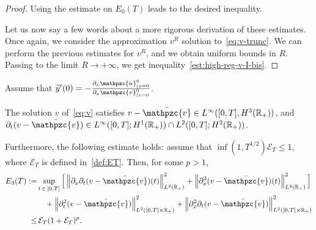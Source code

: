 \documentclass[AHL,Unicode,longabstracts,published]{cedram}
\newcommand{\R}{\mathbb{R}}
\newcommand{\p}{\partial}
\newcommand{\bv}{\bar{\mathpzc{v}}}
\newcommand{\cE}{\mathcal E}
\newcommand{\tv}{\mathpzc{v}}
\newcommand{\tu}{\mathpzc{u}}
\newcommand{\ty}{\widetilde{y}}
\begin{document}
\begin{proof}
Using the estimate on $E_0(T)$ leads to the desired inequality.



Let us now say a few words about a more rigorous derivation of these estimates. Once again, we consider the approximation $v^R$ solution to~\eqref{eq:v-trunc}. We can perform the previous estimates for $v^R$, and we obtain uniform bounds in $R$. Passing to the limit $R\to +\infty$, we get inequality~\eqref{est:high-reg-v-I-bis}.
\end{proof}


\begin{lemm}\label{lem:Hreg-v-2}
Assume that $\ty'(0)= - \frac{\p_x \tu^0_{|x=0}}{\partial_x \tv^0_{|x=0}}$.


The solution $v$ of~\eqref{eq:v} satisfies $v -\bv \in L^\infty([0,T], H^3(\R_+))$, and $\partial_t(v-\bv) \in L^\infty([0,T];H^1(\R_+)) \cap L^2([0,T]; H^2(\R_+))$.

Furthermore, the following estimate holds: assume that $\inf(1, T^{1/2}) \cE_T\leq 1$, where $\cE_T$ is defined in~\eqref{def:ET}. Then, for some $p> 1$,
\begin{equation}\label{est:high-reg-v-II-bis}
\begin{split}
 E_3(T) :=& \sup_{t\,\in\,[0,T]} \Big[\left\|\partial_x \partial_t (v-\bv)(t)\right\|_{L^2(\R_+)}^2 + \left\|\partial^3_x (v-\bv)(t)\right\|_{L^2(\R_+)}^2 \Big]\\
& \quad + \left\|\partial^2_t(v-\bv)\right\|_{L^2([0,T] \times \R_+)}^2 + \left\|\partial^2_x \partial_t (v-\bv)\right\|_{L^2([0,T] \times \R_+)}^2 \\
 \leq&\, \cE_T(1+\cE_T)^p.
\end{split}
\end{equation}
\end{lemm}
\end{document}
